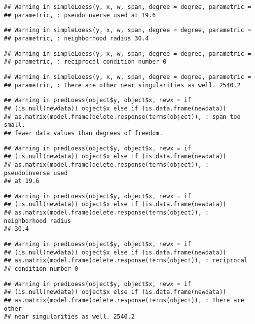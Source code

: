 \documentclass[]{article}
\begin{document}
\begin{verbatim}
## Warning in simpleLoess(y, x, w, span, degree = degree, parametric =
## parametric, : pseudoinverse used at 19.6
\end{verbatim}

\begin{verbatim}
## Warning in simpleLoess(y, x, w, span, degree = degree, parametric =
## parametric, : neighborhood radius 30.4
\end{verbatim}

\begin{verbatim}
## Warning in simpleLoess(y, x, w, span, degree = degree, parametric =
## parametric, : reciprocal condition number 0
\end{verbatim}

\begin{verbatim}
## Warning in simpleLoess(y, x, w, span, degree = degree, parametric =
## parametric, : There are other near singularities as well. 2540.2
\end{verbatim}

\begin{verbatim}
## Warning in predLoess(object$y, object$x, newx = if
## (is.null(newdata)) object$x else if (is.data.frame(newdata))
## as.matrix(model.frame(delete.response(terms(object)), : span too small.
## fewer data values than degrees of freedom.
\end{verbatim}

\begin{verbatim}
## Warning in predLoess(object$y, object$x, newx = if
## (is.null(newdata)) object$x else if (is.data.frame(newdata))
## as.matrix(model.frame(delete.response(terms(object)), : pseudoinverse used
## at 19.6
\end{verbatim}

\begin{verbatim}
## Warning in predLoess(object$y, object$x, newx = if
## (is.null(newdata)) object$x else if (is.data.frame(newdata))
## as.matrix(model.frame(delete.response(terms(object)), : neighborhood radius
## 30.4
\end{verbatim}

\begin{verbatim}
## Warning in predLoess(object$y, object$x, newx = if
## (is.null(newdata)) object$x else if (is.data.frame(newdata))
## as.matrix(model.frame(delete.response(terms(object)), : reciprocal
## condition number 0
\end{verbatim}

\begin{verbatim}
## Warning in predLoess(object$y, object$x, newx = if
## (is.null(newdata)) object$x else if (is.data.frame(newdata))
## as.matrix(model.frame(delete.response(terms(object)), : There are other
## near singularities as well. 2540.2
\end{verbatim}
\end{document}
